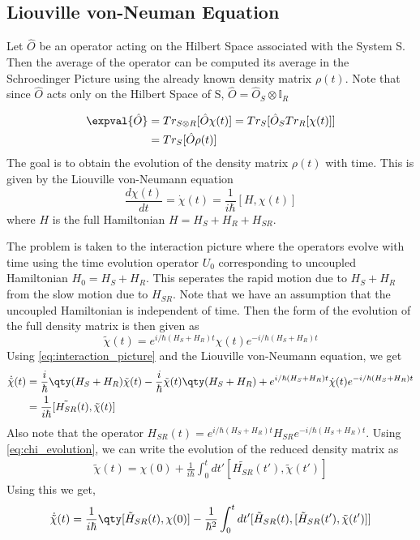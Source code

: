 \documentclass{scrartcl}
\newcommand{\1}{\mathbbm{1}}
\begin{document}
\subsection{Liouville von-Neuman Equation}
Let $\hat{O}$ be an operator acting on the Hilbert Space associated with the System S. Then the average of
the operator can be computed its average in the Schroedinger Picture using the already known density matrix
$\rho(t)$. Note that since $\hat{O}$ acts only on the Hilbert Space of S, $\hat{O} = \hat{O}_S \otimes
	\mathbb{I}_R$

\begin{align}
	\expval{\hat{O}} & = Tr_{S \otimes R}[\hat{O} \chi (t)] = Tr_S[\hat{O}_S Tr_R[\chi (t)]] \\ \nonumber
	                 & = Tr_S[\hat{O} \rho (t)]
\end{align}
The goal is to obtain the evolution of the density matrix $\rho(t)$ with time. This is given by the Liouville von-Neumann equation
\begin{equation}
	\frac{d\chi (t)}{dt} = \dot{\chi}(t)= \frac{1}{i \hbar}[H, \chi (t)]
\end{equation}
where $H$ is the full Hamiltonian $H = H_S + H_R + H_{SR}$.

The problem is taken to the interaction picture where the operators evolve with time
using the time evolution operator $U_0$ corresponding to uncoupled Hamiltonian $H_0 = H_S + H_R$. This seperates the
rapid motion due to $H_S+ H_R$ from the slow motion due to $H_{SR}$. Note that we have an assumption that the uncoupled
Hamiltonian is independent of time. Then the form of the evolution of the full density matrix is then given as
\begin{equation}
	\tilde{\chi}(t) = e^{i\slash \hbar (H_S + H_R)t} \chi (t) e^{-i\slash \hbar (H_S + H_R)t}\label{eq:interaction_picture}
\end{equation}
Using \cref{eq:interaction_picture} and the Liouville von-Neumann equation, we get
\begin{align}
	\dot{\tilde{\chi}}(t) & = \frac{i}{\hbar}\qty(H_S + H_R )\tilde{\chi}(t) - \frac{i}{\hbar} \tilde{\chi}(t) \qty(H_S + H_R) + e^{i\slash \hbar (H_S + H_R)t} \dot{\chi} (t) e^{-i\slash \hbar (H_S + H_R)t} \\ \nonumber
	                      & = \frac{1}{i\hbar} [\tilde{H_{SR}}(t), \tilde{\chi}(t)] \label{eq:chi_evolution}
\end{align}
Also note that the operator $H_{SR}(t) = e^{i\slash \hbar (H_S + H_R)t} H_{SR} e^{-i\slash \hbar (H_S + H_R)t}$.
Using \cref{eq:chi_evolution}, we can write the evolution of the reduced density matrix as
\begin{align*}
	\tilde{\chi}(t) = \chi (0) + \frac{1}{i \hbar} \int_0^t dt' [\tilde{H_{SR}}(t'), \tilde{\chi}(t')]
\end{align*}
Using this we get,
\begin{align}
	\dot{\tilde{\chi}}(t) = \frac{1}{i \hbar} \qty[\tilde{H}_{SR}(t), \chi (0)] - \frac{1}{\hbar^2} \int_0^t dt' [\tilde{H}_{SR}(t), [\tilde{H}_{SR}(t'), \tilde{\chi}(t')]]
\end{align}
\end{document}
